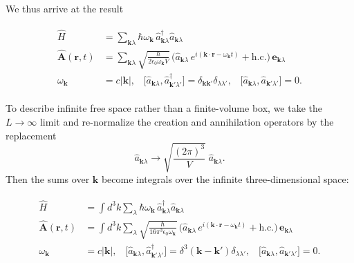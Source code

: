 \documentclass[pra,12pt]{revtex4}
\begin{document}
We thus arrive at the result
\begin{framed}
  \begin{align}
  \begin{aligned}
    \hat{H} &= \sum_{\mathbf{k}\lambda} \hbar \omega_{\mathbf{k}} \,
    \hat{a}^\dagger_{\mathbf{k}\lambda} \hat{a}_{\mathbf{k}\lambda} \\
  \hat{\mathbf{A}}(\mathbf{r},t) &= \sum_{\mathbf{k}\lambda} 
  \sqrt{\frac{\hbar}{2\epsilon_0\omega_{\mathbf{k}}V}}\,
  \Big(\hat{a}_{\mathbf{k}\lambda} \, e^{i(\mathbf{k}\cdot\mathbf{r} - \omega_{\mathbf{k}} t)}
  + \mathrm{h.c.}\Big)\, \mathbf{e}_{\mathbf{k}\lambda} \\
  \omega_{\mathbf{k}} &= c|\mathbf{k}|,  \;\;\;
  \big[\hat{a}_{\mathbf{k}\lambda}, \hat{a}_{\mathbf{k}'\lambda'}^\dagger\big]
  = \delta_{\mathbf{k}\mathbf{k}'} \delta_{\lambda\lambda'}, \;\;\;
  \big[\hat{a}_{\mathbf{k}\lambda}, \hat{a}_{\mathbf{k}'\lambda'}\big]
  = 0.
  \end{aligned}
  \label{qed1}
  \end{align}
\end{framed}
To describe infinite free space rather than a finite-volume box, we
take the $L\rightarrow \infty$ limit and re-normalize the creation and
annihilation operators by the replacement
\begin{equation}
  \hat{a}_{\mathbf{k}\lambda} \rightarrow \sqrt{\frac{(2\pi)^3}{V}} \;
  \hat{a}_{\mathbf{k}\lambda}.
\end{equation}
Then the sums over $\mathbf{k}$ become integrals over the infinite
three-dimensional space:
\begin{framed}
\begin{align}
  \begin{aligned}
    \hat{H} &= \int d^3k\sum_{\lambda} \hbar \omega_{\mathbf{k}} \,
    \hat{a}^\dagger_{\mathbf{k}\lambda} \hat{a}_{\mathbf{k}\lambda} \\
  \hat{\mathbf{A}}(\mathbf{r},t) &= \int d^3k \sum_{\lambda} 
  \sqrt{\frac{\hbar}{16\pi^3\epsilon_0\omega_{\mathbf{k}}}}\,
  \Big(\hat{a}_{\mathbf{k}\lambda} \, e^{i(\mathbf{k}\cdot\mathbf{r} - \omega_{\mathbf{k}} t)}
  + \mathrm{h.c.}\Big)\, \mathbf{e}_{\mathbf{k}\lambda} \\
  \omega_{\mathbf{k}} &= c|\mathbf{k}|,  \;\;\;
  \big[\hat{a}_{\mathbf{k}\lambda}, \hat{a}_{\mathbf{k}'\lambda'}^\dagger\big]
  = \delta^3(\mathbf{k}-\mathbf{k}') \delta_{\lambda\lambda'}, \;\;\;
  \big[\hat{a}_{\mathbf{k}\lambda}, \hat{a}_{\mathbf{k}'\lambda'}\big]
  = 0.
  \end{aligned}
  \label{qed2}
\end{align}
\end{framed}
\end{document}
